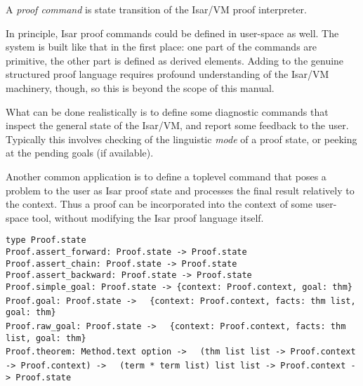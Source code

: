 \begin{isabellebody}
\begin{isamarkuptext}
\begin{enumerate}
  \end{enumerate}%
\end{isamarkuptext}%
\isamarkuptrue%
%
\isamarkuptrue%
%
\begin{isamarkuptext}%
A \emph{proof command} is state transition of the Isar/VM
  proof interpreter.

  In principle, Isar proof commands could be defined in user-space as
  well.  The system is built like that in the first place: one part of
  the commands are primitive, the other part is defined as derived
  elements.  Adding to the genuine structured proof language requires
  profound understanding of the Isar/VM machinery, though, so this is
  beyond the scope of this manual.

  What can be done realistically is to define some diagnostic commands
  that inspect the general state of the Isar/VM, and report some
  feedback to the user.  Typically this involves checking of the
  linguistic \emph{mode} of a proof state, or peeking at the pending
  goals (if available).

  Another common application is to define a toplevel command that
  poses a problem to the user as Isar proof state and processes the
  final result relatively to the context.  Thus a proof can be
  incorporated into the context of some user-space tool, without
  modifying the Isar proof language itself.%
\end{isamarkuptext}%
\isamarkuptrue%
%
\isadelimmlref
%
\endisadelimmlref
%
\isatagmlref
%
\begin{isamarkuptext}%
\begin{mldecls}
  \verb|type Proof.state| \\
  \verb|Proof.assert_forward: Proof.state -> Proof.state| \\
  \verb|Proof.assert_chain: Proof.state -> Proof.state| \\
  \verb|Proof.assert_backward: Proof.state -> Proof.state| \\
  \verb|Proof.simple_goal: Proof.state -> {context: Proof.context, goal: thm}| \\
  \verb|Proof.goal: Proof.state ->|\isasep\isanewline%
\verb|  {context: Proof.context, facts: thm list, goal: thm}| \\
  \verb|Proof.raw_goal: Proof.state ->|\isasep\isanewline%
\verb|  {context: Proof.context, facts: thm list, goal: thm}| \\
  \verb|Proof.theorem: Method.text option ->|\isasep\isanewline%
\verb|  (thm list list -> Proof.context -> Proof.context) ->|\isasep\isanewline%
\verb|  (term * term list) list list -> Proof.context -> Proof.state| \\
  \end{mldecls}


\end{isamarkuptext}
\end{isabellebody}
